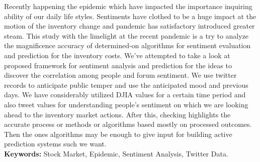 Recently happening the epidemic which have impacted the importance inquiring ability of our daily life styles. Sentiments have clothed to be a huge impact at the motion of the inventory change and pandemic has satisfactory introduced greater steam. This study with the limelight at the recent pandemic is a try to analyze the magnificence accuracy of determined-on algorithms for sentiment evaluation and prediction for the inventory costs. We’ve attempted to take a look at proposed framework for sentiment analysis and prediction for the ideas to discover the correlation among people and forum sentiment. We use twitter records to anticipate public temper and use the anticipated mood and previous days. We have considerably utilized DJIA values for a certain time period and also tweet values for understanding people’s sentiment on which we are looking ahead to the inventory market actions. After this, checking highlights the accurate process or methods or algorithms based mostly on processed outcomes. Then the ones algorithms may be enough to give input for building active prediction systems such we want. \\
\vspace{4pt}
\textbf{Keywords:} Stock Market, Epidemic, Sentiment Analysis, Twitter Data. 
